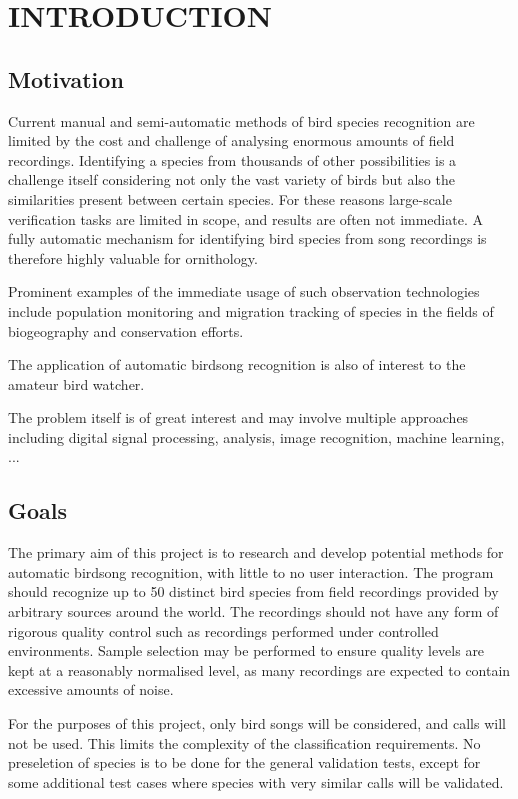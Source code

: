 \chapter{INTRODUCTION}

\section{Motivation}
Current manual and semi-automatic methods of bird species recognition are limited
by the cost and challenge of analysing enormous amounts of field recordings.
Identifying a species from thousands of other possibilities is a challenge itself
considering not only the vast variety of birds but also the similarities
present between certain species.
For these reasons large-scale verification tasks are limited in scope, and results
are often not immediate.
A fully automatic mechanism for identifying bird species from song recordings is
therefore highly valuable for ornithology.

Prominent examples of the immediate usage of such observation technologies include
population monitoring and migration tracking of species in the fields of
biogeography and conservation efforts.

The application of automatic birdsong recognition is also of interest to the
amateur bird watcher.

The problem itself is of great interest and may involve multiple approaches
including digital signal processing, analysis, image recognition, machine learning,
...

\section{Goals}
The primary aim of this project is to research and develop potential methods
for automatic birdsong recognition, with little to no user interaction.
The program should recognize up to 50 distinct bird species from field recordings
provided by arbitrary sources around the world.
The recordings should not have any form of rigorous quality control such as
recordings performed under controlled environments.
Sample selection may be performed to ensure quality levels are kept at a
reasonably normalised level, as many recordings are expected to contain
excessive amounts of noise.

For the purposes of this project, only bird songs will be considered, and calls
will not be used.
This limits the complexity of the classification requirements.
No preseletion of species is to be done for the general validation tests, except
for some additional test cases where species with very similar calls will be
validated.
